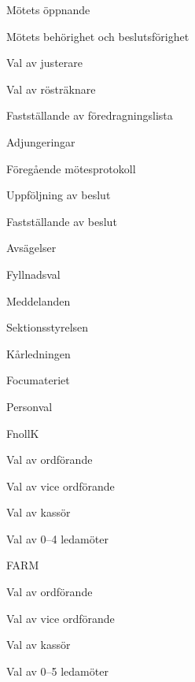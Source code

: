 \documentclass[prelim]{sektionsmote}
\begin{document}
\maketitle

\begin{ootd}

\item{Mötets öppnande}

\item{Mötets behörighet och beslutsförighet}

\item{Val av justerare}

\item{Val av rösträknare}

\item{Fastställande av föredragningslista}

\item{Adjungeringar}

\item{Föregående mötesprotokoll}

\item{Uppföljning av beslut}

\item{Fastställande av beslut}
\begin{ootd}
    \item Avsägelser
    \item Fyllnadsval
\end{ootd}

\item{Meddelanden}
\begin{ootd}
    \item Sektionsstyrelsen
    \item Kårledningen
    \item Focumateriet
\end{ootd}


\item{Personval}
  \begin{ootd}
  \item FnollK
    \begin{ootd}
    \item Val av ordförande
    \item Val av vice ordförande
    \item Val av kassör
    \item Val av 0--4 ledamöter
    \end{ootd}
  \item FARM
    \begin{ootd}
    \item Val av ordförande
    \item Val av vice ordförande
    \item Val av kassör
    \item Val av 0--5 ledamöter
    \end{ootd}
  \end{ootd}


\end{ootd}
\end{document}

